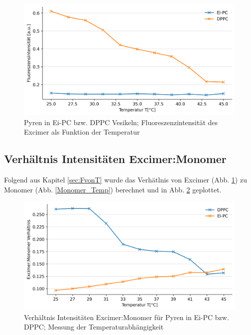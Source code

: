 \begin{figure}[h!]
	\begin{center}
		\begin{minipage}{0,8\textwidth}
			
			\includegraphics[width=\textwidth]{analysis/reports//Excimer_Temp.png}
			\caption{Pyren in Ei-PC bzw. DPPC Vesikeln; Fluoreszenzintensität des Excimer als Funktion der Temperatur} 
			\label{Excimer_Temp} 
		\end{minipage}
	\end{center}
\end{figure}

\subsection{Verhältnis Intensitäten Excimer:Monomer}\label{sec:Ex_Mono}
Folgend aus Kapitel \ref{sec:FvonT} wurde das Verhätlnis von Excimer (Abb. \ref{Excimer_Temp}) zu Monomer (Abb. \ref{Monomer_Temp}) berechnet und in Abb. \ref{Ex_Mono} geplottet.

\begin{figure}[h!]
	\begin{center}
		\begin{minipage}{0,8\textwidth}
			
			\includegraphics[width=\textwidth]{analysis/reports/Ex-Mono.png}
			\caption{Verhältnis Intensitäten Excimer:Monomer für Pyren in Ei-PC bzw. DPPC; Messung der Temperaturabhängigkeit} 
			\label{Ex_Mono} 
		\end{minipage}
	\end{center}
\end{figure}

